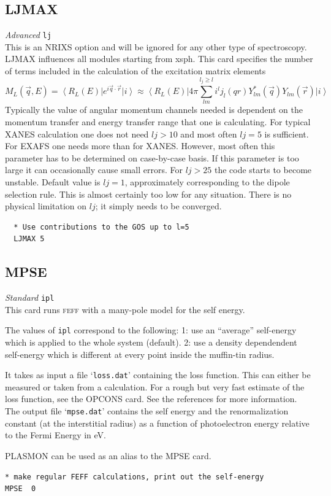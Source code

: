 \documentclass[11pt,oneside]{report} %
\newcommand{\bra}[1]{\left<#1\right\vert}
\newcommand{\ket}[1]{\left\vert#1\right>}
\renewcommand{\htmlref}[2]{\hyperlink{#2}{#1}}
\newcommand{\program}[1]{\textsc{#1}}
\newcommand{\feff}{\program{feff}}
\newenvironment{Card}[4]%
      {\vspace{3ex}%
        \subsection{#1}
        \quad\textsl{#3}\newline
        \quad\texttt{#2}\newline%
        \label{card:#4}\\}
      {}
\newcommand{\file}[1]{`\texttt{#1}'}
\renewcommand{\htmlref}[2]{{#1}} %
\begin{document}
\begin{Card}{LJMAX}{lj}{Advanced}{ljm}
  This is an NRIXS option and will be ignored for any other type of spectroscopy.  LJMAX influences all modules starting 
  from xsph.  This card specifies the number of terms included in the calculation of the excitation matrix elements
  \begin{equation} \label{ljmax}
  M_L(\vec{q},E) = \bra{R_L(E)}e^{i \vec{q}\cdot \vec{r}}\ket{i}  \approx \bra{R_L(E)} 4\pi \sum^{l_j \geq l}_{lm} {i^{l} j_l(qr)Y^{*}_{lm}(\vec{q}) Y_{lm}(\vec{r})} \ket{i} 
  \end{equation}
  Typically the value of angular momentum channels needed is dependent on the momentum
  transfer and energy transfer range that one is calculating. For typical XANES calculation one
  does not need $lj > 10$ and most often $lj = 5$ is sufficient. For EXAFS one needs more than for
  XANES. However, most often this parameter has to be determined on case-by-case basis. If
  this parameter is too large it can occasionally cause small errors. For $lj > 25$ the code starts to become unstable.
  Default value is $lj = 1$, approximately corresponding to the dipole selection rule.  This is almost certainly too low for any
  situation.  There is no physical limitation on $lj$; it simply needs to be converged.
\begin{verbatim}
  * Use contributions to the GOS up to l=5
  LJMAX 5
\end{verbatim}
\end{Card}



\begin{Card}{MPSE}{ipl}{Standard}{mps}
 
  This card runs {\feff} with a many-pole model for the self energy.

  The values of  \texttt{ipl} correspond to the following:  
  1: use an ``average'' self-energy which is applied to the whole
     system (default).
  2: use a density dependendent self-energy which is different at
     every point inside the muffin-tin radius.

  It takes as input a file \file{loss.dat} containing the loss function.  This can
  either be measured or taken from a calculation. For a rough but very
  fast estimate of the loss function, see the
  \htmlref{OPCONS}{card:opc} card. See the references for more  
  information.  
  The output file \file{mpse.dat} contains the self energy and the renormalization
  constant (at the interstitial radius) as a function of photoelectron
  energy relative to the Fermi Energy in eV.

  PLASMON can be used as an alias to the MPSE card. 

\begin{verbatim}
* make regular FEFF calculations, print out the self-energy
MPSE  0
\end{verbatim}

\end{Card}
\end{document}
